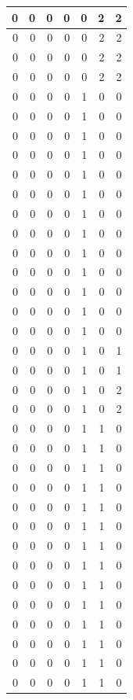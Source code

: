 \documentclass[
  12pt,
]{krantz}
\begin{document}
\begin{tabular}{r|r|r|r|r|r|r}
\hline
0 & 0 & 0 & 0 & 0 & 2 & 2\\
\hline
0 & 0 & 0 & 0 & 0 & 2 & 2\\
\hline
0 & 0 & 0 & 0 & 0 & 2 & 2\\
\hline
0 & 0 & 0 & 0 & 0 & 2 & 2\\
\hline
0 & 0 & 0 & 0 & 1 & 0 & 0\\
\hline
0 & 0 & 0 & 0 & 1 & 0 & 0\\
\hline
0 & 0 & 0 & 0 & 1 & 0 & 0\\
\hline
0 & 0 & 0 & 0 & 1 & 0 & 0\\
\hline
0 & 0 & 0 & 0 & 1 & 0 & 0\\
\hline
0 & 0 & 0 & 0 & 1 & 0 & 0\\
\hline
0 & 0 & 0 & 0 & 1 & 0 & 0\\
\hline
0 & 0 & 0 & 0 & 1 & 0 & 0\\
\hline
0 & 0 & 0 & 0 & 1 & 0 & 0\\
\hline
0 & 0 & 0 & 0 & 1 & 0 & 0\\
\hline
0 & 0 & 0 & 0 & 1 & 0 & 0\\
\hline
0 & 0 & 0 & 0 & 1 & 0 & 0\\
\hline
0 & 0 & 0 & 0 & 1 & 0 & 0\\
\hline
0 & 0 & 0 & 0 & 1 & 0 & 1\\
\hline
0 & 0 & 0 & 0 & 1 & 0 & 1\\
\hline
0 & 0 & 0 & 0 & 1 & 0 & 2\\
\hline
0 & 0 & 0 & 0 & 1 & 0 & 2\\
\hline
0 & 0 & 0 & 0 & 1 & 1 & 0\\
\hline
0 & 0 & 0 & 0 & 1 & 1 & 0\\
\hline
0 & 0 & 0 & 0 & 1 & 1 & 0\\
\hline
0 & 0 & 0 & 0 & 1 & 1 & 0\\
\hline
0 & 0 & 0 & 0 & 1 & 1 & 0\\
\hline
0 & 0 & 0 & 0 & 1 & 1 & 0\\
\hline
0 & 0 & 0 & 0 & 1 & 1 & 0\\
\hline
0 & 0 & 0 & 0 & 1 & 1 & 0\\
\hline
0 & 0 & 0 & 0 & 1 & 1 & 0\\
\hline
0 & 0 & 0 & 0 & 1 & 1 & 0\\
\hline
0 & 0 & 0 & 0 & 1 & 1 & 0\\
\hline
0 & 0 & 0 & 0 & 1 & 1 & 0\\
\hline
0 & 0 & 0 & 0 & 1 & 1 & 0\\
\hline
0 & 0 & 0 & 0 & 1 & 1 & 0\\

\end{tabular}
\end{document}
